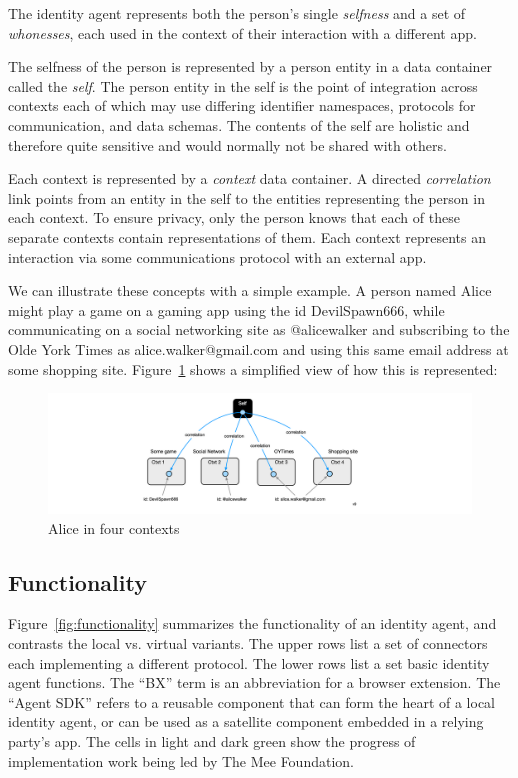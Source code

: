 \documentclass[11pt, oneside]{article}   	%
\begin{document}
The identity agent represents both the person's single \emph{selfness} and a set of \emph{whonesses}, each used in the context of their interaction with a different app.

The selfness of the person is represented by a person entity in a data container called the \emph{self}. The person entity in the self is the point of integration across contexts each of which may use differing identifier namespaces, protocols for communication, and data schemas. The contents of the self are holistic and therefore quite sensitive and would normally not be shared with others. 

Each context is represented by a \emph{context} data container. A directed \emph{correlation} link points from an entity in the self to the entities representing the person in each context. To ensure privacy, only the person knows that each of these separate contexts contain representations of them. Each context represents an interaction via some communications protocol with an external app. 

We can illustrate these concepts with a simple example. A person named Alice might play a game on a gaming app using the id DevilSpawn666, while communicating on a social networking site as @alicewalker and subscribing to the Olde York Times as alice.walker@gmail.com and using this same email address at some shopping site. Figure~\ref{fig:three-contexts} shows a simplified view of how this is represented:

\begin{figure}[htbp]
\includegraphics[width=\textwidth]{./images/example1.png}
\caption{Alice in four contexts}
\label{fig:three-contexts}
\end{figure}

\subsection{Functionality}

Figure~\ref{fig:functionality} summarizes the functionality of an identity agent, and contrasts the local vs. virtual variants. The upper rows list a set of connectors each implementing a different protocol. The lower rows list a set basic identity agent functions. The ``BX'' term is an abbreviation for a browser extension. The ``Agent SDK'' refers to a reusable component that can form the heart of a local identity agent, or can be used as a satellite component embedded in a relying party's app. The cells in light and dark green show the progress of implementation work being led by The Mee Foundation. 
\end{document}
